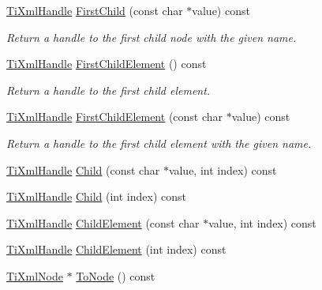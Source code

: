 \begin{DoxyCompactItemize}
\mbox{\label{classTiXmlHandle_a586ebaca4a4d0909db65a765d95d5e59}} 
\hyperlink{classTiXmlHandle}{Ti\+Xml\+Handle} \hyperlink{classTiXmlHandle_a586ebaca4a4d0909db65a765d95d5e59}{First\+Child} (const char $\ast$value) const
\begin{DoxyCompactList}\small\item\em Return a handle to the first child node with the given name. \end{DoxyCompactList}\item 
\mbox{\label{classTiXmlHandle_af0643f8683f3f2b779b8c9d78c67b2c0}} 
\hyperlink{classTiXmlHandle}{Ti\+Xml\+Handle} \hyperlink{classTiXmlHandle_af0643f8683f3f2b779b8c9d78c67b2c0}{First\+Child\+Element} () const
\begin{DoxyCompactList}\small\item\em Return a handle to the first child element. \end{DoxyCompactList}\item 
\mbox{\label{classTiXmlHandle_a3eaf2d2d4c087cd8a48da261042e75bc}} 
\hyperlink{classTiXmlHandle}{Ti\+Xml\+Handle} \hyperlink{classTiXmlHandle_a3eaf2d2d4c087cd8a48da261042e75bc}{First\+Child\+Element} (const char $\ast$value) const
\begin{DoxyCompactList}\small\item\em Return a handle to the first child element with the given name. \end{DoxyCompactList}\item 
\hyperlink{classTiXmlHandle}{Ti\+Xml\+Handle} \hyperlink{classTiXmlHandle_a9903b035444ee36450fe00ede403f920}{Child} (const char $\ast$value, int index) const
\item 
\hyperlink{classTiXmlHandle}{Ti\+Xml\+Handle} \hyperlink{classTiXmlHandle_a32585942abb28e03eea9c5223f38a659}{Child} (int index) const
\item 
\hyperlink{classTiXmlHandle}{Ti\+Xml\+Handle} \hyperlink{classTiXmlHandle_afccc59d8a0daa8c5d78474fbed430ddb}{Child\+Element} (const char $\ast$value, int index) const
\item 
\hyperlink{classTiXmlHandle}{Ti\+Xml\+Handle} \hyperlink{classTiXmlHandle_a57a639ab0ac99ff9358f675a1b73049a}{Child\+Element} (int index) const
\item 
\hyperlink{classTiXmlNode}{Ti\+Xml\+Node} $\ast$ \hyperlink{classTiXmlHandle_a0e436dea2dd869a859e3a4486023f0fa}{To\+Node} () const

\end{DoxyCompactItemize}
